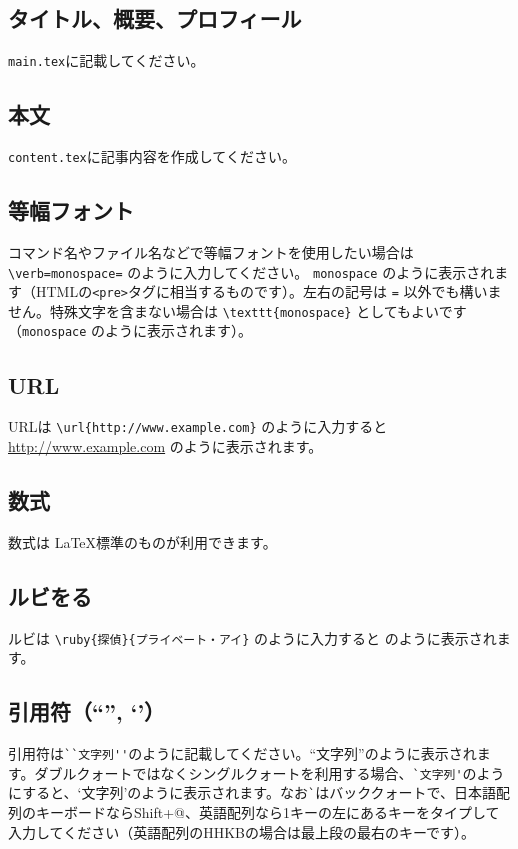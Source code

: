 \subsection{タイトル、概要、プロフィール}
\verb=main.tex=に記載してください。

\subsection{本文}
\verb=content.tex=に記事内容を作成してください。

\subsection{等幅フォント}
コマンド名やファイル名などで等幅フォントを使用したい場合は \verb|\verb=monospace=| のように入力してください。 \verb=monospace= のように表示されます（HTMLの\verb|<pre>|タグに相当するものです）。左右の記号は \verb|=| 以外でも構いません。特殊文字を含まない場合は \verb|\texttt{monospace}| としてもよいです（\texttt{monospace} のように表示されます）。

\subsection{URL}
URLは \verb=\url{http://www.example.com}= のように入力すると \url{http://www.example.com} のように表示されます。

\subsection{数式}
数式は \LaTeX 標準のものが利用できます。

\subsection{ルビをる}
ルビは \verb=\ruby{探偵}{プライベート・アイ}= のように入力すると  のように表示されます。

\subsection{引用符（``'', `'）}
引用符は\verb=``文字列''=のように記載してください。``文字列''のように表示されます。ダブルクォートではなくシングルクォートを利用する場合、\verb=`文字列'=のようにすると、`文字列'のように表示されます。なお\verb=`=はバッククォートで、日本語配列のキーボードならShift+@、英語配列なら1キーの左にあるキーをタイプして入力してください（英語配列のHHKBの場合は最上段の最右のキーです）。

